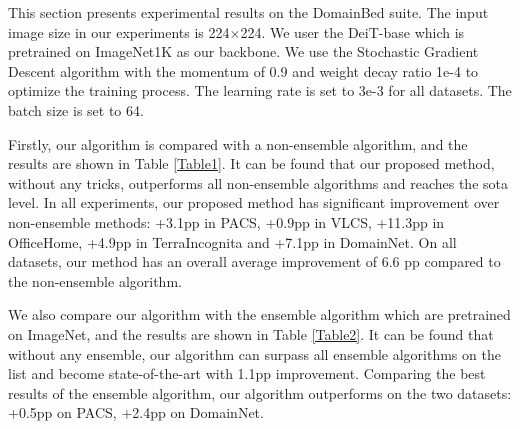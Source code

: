 \documentclass{article}
\begin{document}
This section presents experimental results on the DomainBed suite. The input image size in our experiments is 224×224. We user the DeiT-base \cite{touvron2021training} which is pretrained on  ImageNet1K as our backbone. We use the Stochastic Gradient Descent algorithm with the momentum of 0.9 and weight decay ratio 1e-4 to optimize the training process. The learning rate is set to 3e-3 for all datasets. The batch size is set to 64. 

Firstly, our algorithm is compared with a non-ensemble algorithm, and the results are shown in Table \ref{Table1}. It can be found that our proposed method, without any tricks, outperforms all non-ensemble algorithms and reaches the sota level. In all experiments, our proposed method has significant improvement over non-ensemble methods: +3.1pp in PACS, +0.9pp in VLCS, +11.3pp in OfficeHome, +4.9pp in TerraIncognita and +7.1pp in DomainNet. On all datasets, our method has an overall average improvement of 6.6 pp compared to the non-ensemble algorithm.

We also compare our algorithm with the ensemble algorithm which are pretrained on ImageNet, and the results are shown in Table \ref{Table2}. It can be found that without any ensemble, our algorithm can surpass all ensemble algorithms on the list and become state-of-the-art with 1.1pp improvement. Comparing the best results of the ensemble algorithm, our algorithm  outperforms on the two datasets: +0.5pp  on PACS,  +2.4pp on DomainNet.
\end{document}
